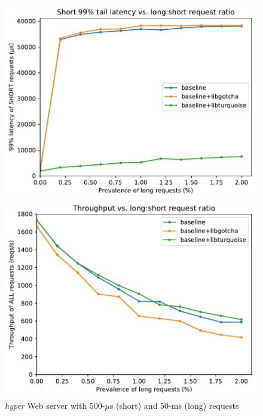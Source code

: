 \begin{figure}[t]
	\begin{minipage}{\columnwidth}
	\includegraphics[width=\textwidth]{figs/twooom_99-short}
	\end{minipage}
%
	\begin{minipage}{\columnwidth}
	\includegraphics[width=\textwidth]{figs/twooom_tput}
	\end{minipage}
\caption{\textit{hyper} Web server with 500-$\mu$s (short) and 50-ms (long) requests}
\label{fig:hyper}
\end{figure}

